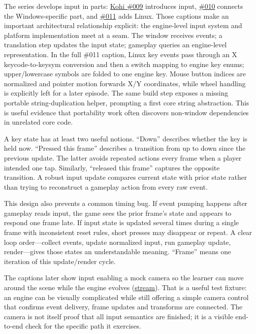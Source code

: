The series develops input in parts: \href{https://www.youtube.com/watch?v=ZZhfCYNbVp8}{Kohi \#009} introduces input, \href{https://www.youtube.com/watch?v=6zjpgUX1TRY}{\#010} connects the Windows-specific part, and \href{https://www.youtube.com/watch?v=kIWFdKcGQPM}{\#011} adds Linux. Those captions make an important architectural relationship explicit: the engine-level input system and platform implementation meet at a seam. The window receives events; a translation step updates the input state; gameplay queries an engine-level representation. In the full \#011 caption, Linux key events pass through an X keycode-to-keysym conversion and then a switch mapping to engine key enums; upper/lowercase symbols are folded to one engine key. Mouse button indices are normalized and pointer motion forwards X/Y coordinates, while wheel handling is explicitly left for a later episode. The same build step exposes a missing portable string-duplication helper, prompting a first core string abstraction. This is useful evidence that portability work often discovers non-window dependencies in unrelated core code.

A key state has at least two useful notions. ``Down'' describes whether the key is held now. ``Pressed this frame'' describes a transition from up to down since the previous update. The latter avoids repeated actions every frame when a player intended one tap. Similarly, ``released this frame'' captures the opposite transition. A robust input update compares current state with prior state rather than trying to reconstruct a gameplay action from every raw event.

This design also prevents a common timing bug. If event pumping happens after gameplay reads input, the game sees the prior frame's state and appears to respond one frame late. If input state is updated several times during a single frame with inconsistent reset rules, short presses may disappear or repeat. A clear loop order---collect events, update normalized input, run gameplay update, render---gives those states an understandable meaning. ``Frame'' means one iteration of this update/render cycle.

The captions later show input enabling a mock camera so the learner can move around the scene while the engine evolves (\href{https://www.youtube.com/watch?v=s9xSwQvbG2w}{stream}). That is a useful test fixture: an engine can be visually complicated while still offering a simple camera control that confirms event delivery, frame updates and transforms are connected. The camera is not itself proof that all input semantics are finished; it is a visible end-to-end check for the specific path it exercises.

